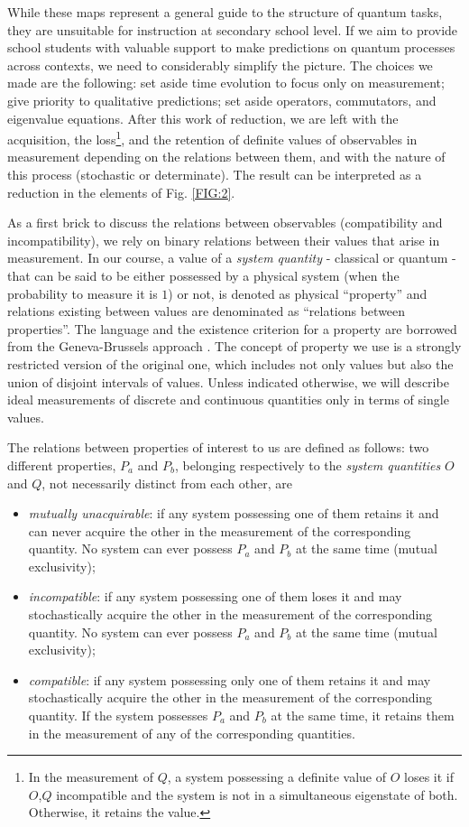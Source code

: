 \documentclass[twocolumn,secnumarabic,amssymb, nobibnotes, aps, prd, nofootinbib]{revtex4-2}
\begin{document}
While these maps represent a general guide to the structure of quantum tasks, they are unsuitable for instruction at secondary school level. If we aim to provide school students with valuable support to make predictions on quantum processes across contexts, we need to considerably simplify the picture. The choices we made are the following: set aside time evolution to focus only on measurement; give priority to qualitative predictions; set aside operators, commutators, and eigenvalue equations. After this work of reduction, we are left with the acquisition, the loss\footnote{In the measurement of $Q$, a system possessing a definite value of $O$ loses it if $O$,$Q$ incompatible and the system is not in a simultaneous eigenstate of both. Otherwise, it retains the value.}, and the retention of definite values of observables in measurement depending on the relations between them, and with the nature of this process (stochastic or determinate). The result can be interpreted as a reduction in the elements of Fig. \ref{FIG:2}.

As a first brick to discuss the relations between observables (compatibility and incompatibility), we rely on binary relations between their values that arise in measurement. In our course, a value of a \emph{system quantity} - classical or quantum - that can be said to be either possessed by a physical system (when the probability to measure it is $1$) or not, is denoted as physical ``property'' and relations existing between values are denominated as ``relations between properties''. The language and the existence criterion for a property are borrowed from the Geneva-Brussels approach \cite[see, e.g.,][]{Debianchi2011}. The concept of property we use is a strongly restricted version of the original one, which includes not only values but also the union of disjoint intervals of values. Unless indicated otherwise, we will describe ideal measurements of discrete and continuous quantities only in terms of single values.

The relations between properties of interest to us are defined as follows: two different properties, $P_a$ and $P_b$, belonging respectively to the \emph{system quantities} $O$ and $Q$, not necessarily distinct from each other, are
\begin{itemize}
    \item \emph{mutually unacquirable}: if any system possessing one of them retains it and can never acquire the other in the measurement of the corresponding quantity. No system can ever possess $P_a$ and $P_b$ at the same time (mutual exclusivity);
    \item \emph{incompatible}: if any system possessing one of them loses it and may stochastically acquire the other in the measurement of the corresponding quantity. No system can ever possess $P_a$ and $P_b$ at the same time (mutual exclusivity);
    \item \emph{compatible}: if any system possessing only one of them retains it and may stochastically acquire the other in the measurement of the corresponding quantity. If the system possesses $P_a$ and $P_b$ at the same time, it retains them in the measurement of any of the corresponding quantities.
\end{itemize}
\end{document}
